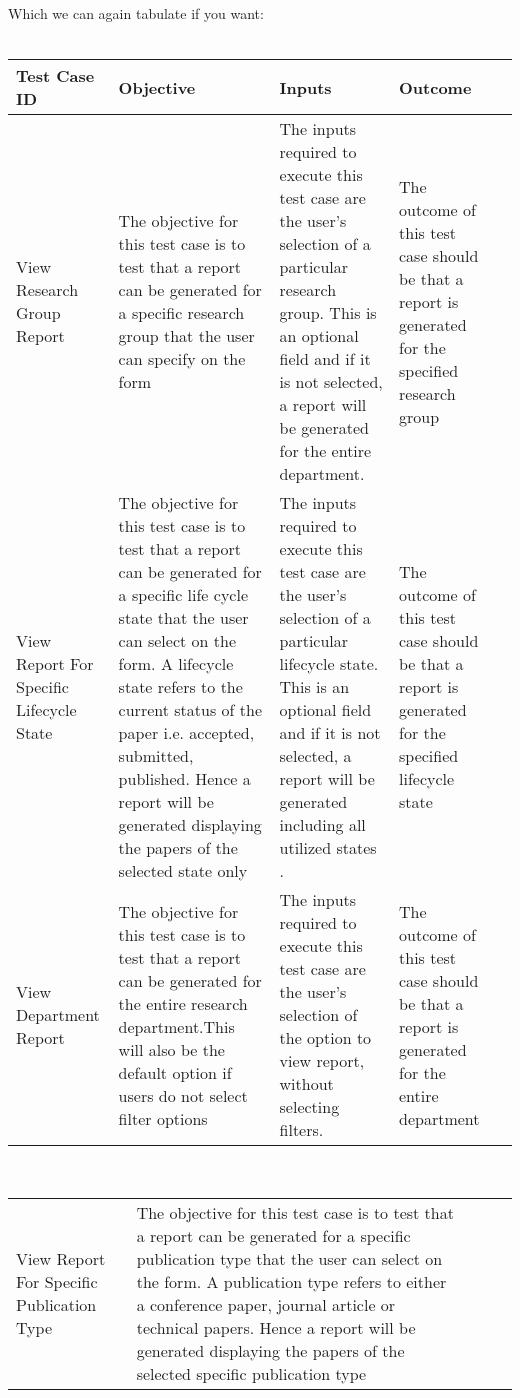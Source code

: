 \begin{enumerate}
Which we can again tabulate if you want: \\\\
\begin{tabular}{ L{3cm}| L{3cm}| L{3cm}| L{3cm}| L{0cm}} 
	\hline      
	\textbf{Test Case ID} & \textbf{Objective} & \textbf{Inputs} & \textbf{Outcome}\\
	\hline 
	\hline
	View Research Group Report  &  
	The objective for this test case is to test that a report can be generated for a specific research group that the user can specify on the form & 
	The inputs required to execute this test case are the user's selection of a particular research group. This is an optional field and if it is not selected, a report will be generated for the entire department. & 
	The outcome of this test case should be that a report is generated for the specified research group & \\
	\hline 
View Report For Specific Lifecycle State  &  
	The objective for this test case is to test that a report can be generated for a specific life cycle state that the user can select on the form. A lifecycle state refers to the current status of the paper i.e. accepted, submitted, published. Hence a report will be generated displaying the papers of the selected state only & 
	The inputs required to execute this test case are the user's selection of a particular lifecycle state. This is an optional field and if it is not selected, a report will be generated including all utilized states . & 
	The outcome of this test case should be that a report is generated for the specified lifecycle state & \\ 
	\hline 
View Department Report &  
	The objective for this test case is to test that a report can be generated for the entire research department.This will also be the default option if users do not select filter options & 
	The inputs required to execute this test case are the user's selection of the option to view report, without selecting filters. & 
	The outcome of this test case should be that a report is generated for the entire department& \\ 
\end{tabular}
\\
\begin{tabular}{ L{3cm}| L{3cm}| L{3cm}| L{3cm}| L{0cm}} 
\hline 
View Report For Specific Publication Type &  
The objective for this test case is to test that a report can be generated for a specific publication type that the user can select on the form. A publication type refers to either a conference paper, journal article or technical papers. Hence a report will be generated displaying the papers of the selected specific publication type & 

\end{tabular}
\end{enumerate}
